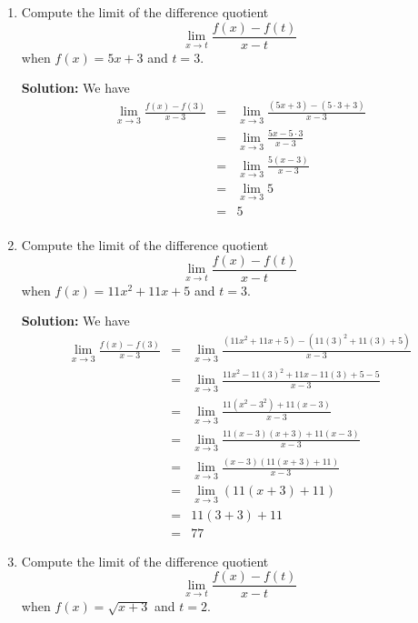 \documentclass{article}
\begin{document}
\ActivityTitle[class=Calculus I, number=2, name=Continuity (Solutions)]

\begin{enumerate}
\item Compute the limit of the difference quotient \[ \lim_{x \rightarrow t} \frac{f(x) - f(t)}{x - t} \] when $f(x) = 5 x + 3$ and $t = 3$.

\textbf{Solution:} We have
\begin{eqnarray*}
\lim_{x \rightarrow 3} \frac{f(x) - f(3)}{x - 3} & = & \lim_{x \rightarrow 3} \frac{(5 x + 3) - (5 \cdot 3 + 3)}{x - 3} \\
 & = & \lim_{x \rightarrow 3} \frac{5 x - 5 \cdot 3}{x - 3} \\
 & = & \lim_{x \rightarrow 3} \frac{5(x - 3)}{x - 3} \\
 & = & \lim_{x \rightarrow 3} 5 \\
 & = & 5 \\
\end{eqnarray*}


  
\vspace{1cm}

\item Compute the limit of the difference quotient \[ \lim_{x \rightarrow t} \frac{f(x) - f(t)}{x - t} \] when $f(x) = 11 x^2 + 11 x + 5$ and $t = 3$.

\textbf{Solution:} We have
\begin{eqnarray*}
\lim_{x \rightarrow 3} \frac{f(x) - f(3)}{x - 3} & = & \lim_{x \rightarrow 3} \frac{(11 x^2 + 11 x + 5) - (11 (3)^2 + 11(3) + 5)}{x - 3} \\
 & = & \lim_{x \rightarrow 3} \frac{11 x^2 - 11(3)^2 + 11 x - 11(3) + 5 - 5}{x - 3} \\
 & = & \lim_{x \rightarrow 3} \frac{11(x^2 - 3^2) + 11(x - 3)}{x - 3} \\
 & = & \lim_{x \rightarrow 3} \frac{11(x - 3)(x + 3) + 11(x - 3)}{x - 3} \\
 & = & \lim_{x \rightarrow 3} \frac{(x - 3)(11(x + 3) + 11)}{x - 3} \\
 & = & \lim_{x \rightarrow 3} \left( 11(x + 3) + 11 \right) \\
 & = & 11(3 + 3) + 11\\
 & = & 77
\end{eqnarray*}


  
\vspace{1cm}

\item Compute the limit of the difference quotient \[ \lim_{x \rightarrow t} \frac{f(x) - f(t)}{x - t} \] when $f(x) = \sqrt{x + 3}$ and $t = 2$.


\end{enumerate}
\end{document}

